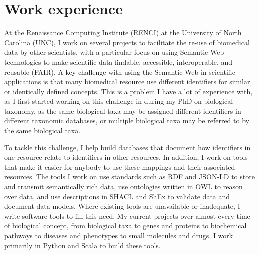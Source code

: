 

\part{Work experience}


At the Renaissance Computing Institute (RENCI) at the University of North Carolina (UNC), I work on several projects to facilitate the re-use of biomedical data by other scientists, with a particular focus on using Semantic Web technologies to make scientific data findable, accessible, interoperable, and reusable (FAIR). A key challenge with using the Semantic Web in scientific applications is that many biomedical resource use different identifiers for similar or identically defined concepts. This is a problem I have a lot of experience with, as I first started working on this challenge in during my PhD on biological taxonomy, as the same biological taxa may be assigned different identifiers in different taxonomic databases, or multiple biological taxa may be referred to by the same biological taxa.

To tackle this challenge, I help build databases that document how identifiers in one resource relate to identifiers in other resources. In addition, I work on tools that make it easier for anybody to use these mappings and their associated resources. The tools I work on use standards such as RDF and JSON-LD to store and transmit semantically rich data, use ontologies written in OWL to reason over data, and use descriptions in SHACL and ShEx to validate data and document data models. Where existing tools are unavailable or inadequate, I write software tools to fill this need. My current projects over almost every time of biological concept, from biological taxa to genes and proteins to biochemical pathways to diseases and phenotypes to small molecules and drugs. I work primarily in Python and Scala to build these tools.

